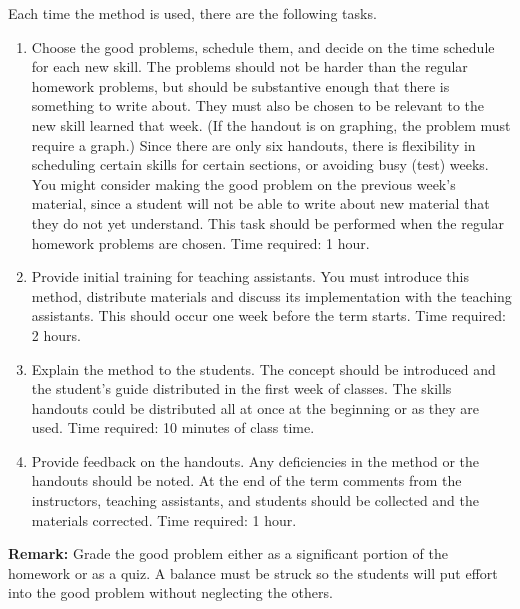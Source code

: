 Each time the method is used, there are the following tasks.
\begin{enumerate}
\item 
Choose the good problems, schedule them, and decide on the time
schedule for each new skill. The problems should not be harder than
the regular homework problems, but should be substantive enough that
there is something to write about. They must also be chosen to be
relevant to the new skill learned that week. (If the handout is on
graphing, the problem must require a graph.) Since there are only six
handouts, there is flexibility in
scheduling certain skills for certain sections, or avoiding busy
(test) weeks.  You might consider making the good problem on the
previous week's material, since a student will not be able to write
about new material that they do not yet understand.  This task should
be performed when the regular homework problems are chosen. Time
required: 1 hour.  \item Provide initial training for teaching
assistants. You must introduce this method, distribute materials and
discuss its implementation with the teaching assistants. This should
occur one week before the term starts. Time required: 2 hours.
\item Explain the method to the students. The concept should be
introduced and the student's guide distributed in the first week of
classes. The skills handouts could be distributed all at once at the
beginning or as they are used. Time required: 10 minutes of class
time.  \item Provide feedback on the handouts. Any deficiencies in the
method or the handouts should be noted. At the end of the term
comments from the instructors, teaching assistants, and students
should be collected and the materials corrected. Time required: 1
hour.
\end{enumerate}

{\bf Remark:}
Grade the good problem either as a significant portion of the homework or as a
quiz. A balance must be struck so the students will put effort into the
good problem without neglecting the others. 






